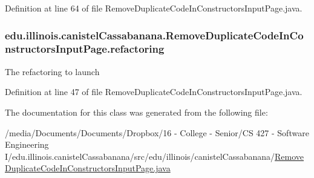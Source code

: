 Definition at line 64 of file RemoveDuplicateCodeInConstructorsInputPage.java.

\hypertarget{classedu_1_1illinois_1_1canistelCassabanana_1_1RemoveDuplicateCodeInConstructorsInputPage_a70db3718069b9b46170f0cc912086da2}{
\subsubsection[{refactoring}]{ {\bf edu.illinois.canistelCassabanana.RemoveDuplicateCodeInConstructorsInputPage.refactoring}}}
\label{classedu_1_1illinois_1_1canistelCassabanana_1_1RemoveDuplicateCodeInConstructorsInputPage_a70db3718069b9b46170f0cc912086da2}
The refactoring to launch 

Definition at line 47 of file RemoveDuplicateCodeInConstructorsInputPage.java.



The documentation for this class was generated from the following file:\begin{DoxyCompactItemize}
\item 
/media/Documents/Documents/Dropbox/16 -\/ College -\/ Senior/CS 427 -\/ Software Engineering I/edu.illinois.canistelCassabanana/src/edu/illinois/canistelCassabanana/\hyperlink{RemoveDuplicateCodeInConstructorsInputPage_8java}{RemoveDuplicateCodeInConstructorsInputPage.java}\end{DoxyCompactItemize}
